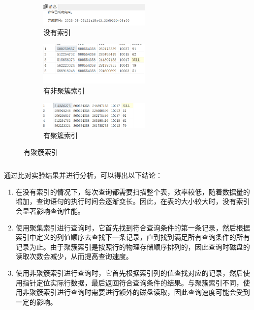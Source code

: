\documentclass[a4paper,twoside]{article}
\begin{document}
\begin{spacing}{1.2}
\begin{enumerate}
\begin{figure}[H]
  \centering
  \begin{subfigure}{0.45\textwidth}
  \caption{没有索引}
  \includegraphics[width=0.6\textwidth]{143-1.png}
  \end{subfigure}
  \begin{subfigure}{0.45\textwidth}
  \caption{有非聚簇索引}
    \includegraphics[width=0.6\textwidth]{143-2.png}
  \end{subfigure}
  \begin{subfigure}{0.45\textwidth}
    \caption{有聚簇索引}
      \includegraphics[width=0.6\textwidth]{143-3.png}
    \end{subfigure}
\end{figure}

\inputminted[firstline=38,lastline=45]{sql}{../code/4.sql}

通过比对实验结果并进行分析，可以得出以下结论：
\begin{enumerate}
\item 在没有索引的情况下，每次查询都需要扫描整个表，效率较低，随着数据量的增加，查询语句的执行时间会逐渐变长。因此，在表的大小较大时，没有索引会显著影响查询性能。
\item 使用聚集索引进行查询时，它首先找到符合查询条件的第一条记录，然后根据索引中定义的列值顺序去查找下一条记录，直到找到满足所有查询条件的所有记录为止。由于聚簇索引是按照行的物理存储顺序排列的，因此查询时磁盘的读取次数会减少，从而提高查询速度。
\item 使用非聚簇索引进行查询时，它首先根据索引列的值查找对应的记录，然后使用指针定位实际行数据，最后返回符合查询条件的结果。与聚簇索引不同，使用非聚簇索引进行查询时需要进行额外的磁盘读取，因此查询速度可能会受到一定的影响。
\end{enumerate}


\end{enumerate}
\end{spacing}
\end{document}
